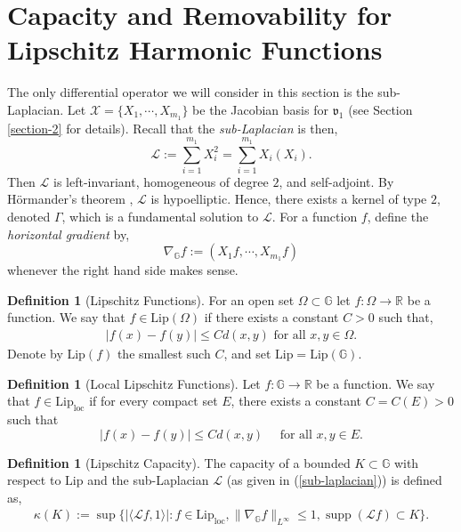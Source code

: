 \documentclass[12pt,a4paper,reqno]{amsart}
\DeclareMathOperator{\supp}{supp}
\newcommand{\cg}{\Gamma}
\renewcommand{\L}{\mathcal{L}}
\renewcommand{\k}{\kappa}
\newcommand{\vf}{\mathfrak{v}}
\newcommand{\R}{\mathbb{R}}
\newcommand{\G}{\mathbb{G}}
\numberwithin{equation}{section}
\theoremstyle{definition}
\newtheorem{defn}[thm]{Definition}
\begin{document}
\section{Capacity and Removability for Lipschitz Harmonic Functions}\label{lip-section}
The only differential operator we will consider in this section is the sub-Laplacian. Let $\mathcal{X} = \{X_1, \cdots , X_{m_1}\}$ be the Jacobian basis for $\vf_1$ (see Section \ref{section-2} for details). Recall that the \emph{sub-Laplacian} is then, \begin{equation}\label{sub-laplacian}
    \L := \sum_{i=1}^{m_1} X_i^2 = \sum_{i=1}^{m_1}X_i(X_i).
\end{equation}
Then $\L$ is left-invariant, homogeneous of degree $2$, and self-adjoint. By H\"{o}rmander's theorem \cite[Theorem 1 in the preface]{BLU}, $\L$ is hypoelliptic. Hence, there exists a kernel of type $2$, denoted $\cg$, which is a fundamental solution to $\L$. For a function $f$, define the \textit{horizontal gradient} by, 
\begin{equation}\label{horiz-grad}
\nabla_{\G}f := (X_1 f, \cdots, X_{m_1}f)    
\end{equation}
whenever the right hand side makes sense.

\begin{defn}[Lipschitz Functions]
For an open set $\Omega \subset \G$ let $f : \Omega \rightarrow \R$ be a function. We say that $f \in \text{Lip}(\Omega)$ if there exists a constant $C>0$ such that, \begin{align*}
    |f(x) - f(y)| \leq C d(x,y) \text{ for all }x,y\in \Omega.
\end{align*}
Denote by $\text{Lip}(f)$ the smallest such $C$, and set $\text{Lip} = \text{Lip}(\G)$.
\end{defn}

\begin{defn}[Local Lipschitz Functions]
Let $f: \G \rightarrow \R$ be a function. We say that $f \in \text{Lip}_{\text{loc}}$ if for every compact set $E$, there exists a constant $C = C(E) >0$ such that $$|f(x)- f(y)| \leq Cd(x,y) \quad \text{ for all }x,y\in E.$$   
\end{defn}

\begin{defn}[Lipschitz Capacity]
The capacity of a bounded $K \subset \G$ with respect to $\text{Lip}$ and the sub-Laplacian $\L$ (as given in (\ref{sub-laplacian})) is defined as, 
\begin{align*}
 \k(K) := \sup \{ |\langle \L f, 1 \rangle |: f \in \text{Lip}_{\text{loc}}, \| \nabla_{\G}f\|_{L^{\infty}} \leq 1, \supp(\L f) \subset K\}. 
\end{align*}    
\end{defn}
\end{document}
